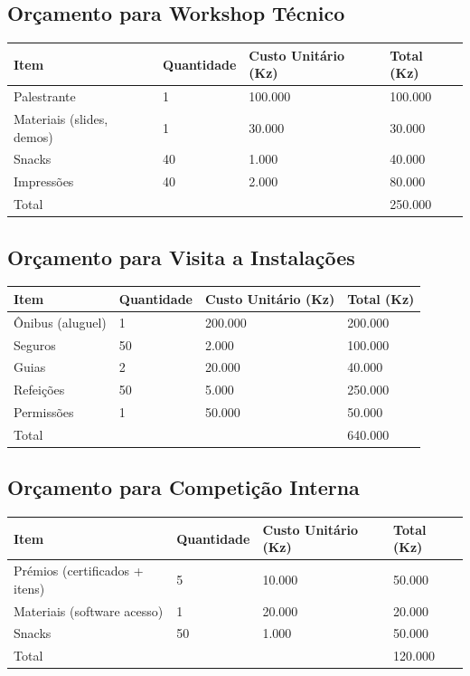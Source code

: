 \documentclass[12pt]{article}
\begin{document}
\subsection{Orçamento para Workshop Técnico}
\begin{longtable}{|l|l|l|l|}
\hline
Item & Quantidade & Custo Unitário (Kz) & Total (Kz) \\
\hline
Palestrante & 1 & 100.000 & 100.000 \\
Materiais (slides, demos) & 1 & 30.000 & 30.000 \\
Snacks & 40 & 1.000 & 40.000 \\
Impressões & 40 & 2.000 & 80.000 \\
\hline
Total & & & 250.000 \\
\hline
\end{longtable}

\subsection{Orçamento para Visita a Instalações}
\begin{longtable}{|l|l|l|l|}
\hline
Item & Quantidade & Custo Unitário (Kz) & Total (Kz) \\
\hline
Ônibus (aluguel) & 1 & 200.000 & 200.000 \\
Seguros & 50 & 2.000 & 100.000 \\
Guias & 2 & 20.000 & 40.000 \\
Refeições & 50 & 5.000 & 250.000 \\
Permissões & 1 & 50.000 & 50.000 \\
\hline
Total & & & 640.000 \\
\hline
\end{longtable}

\subsection{Orçamento para Competição Interna}
\begin{longtable}{|l|l|l|l|}
\hline
Item & Quantidade & Custo Unitário (Kz) & Total (Kz) \\
\hline
Prémios (certificados + itens) & 5 & 10.000 & 50.000 \\
Materiais (software acesso) & 1 & 20.000 & 20.000 \\
Snacks & 50 & 1.000 & 50.000 \\
\hline
Total & & & 120.000 \\
\hline
\end{longtable}
\end{document}
